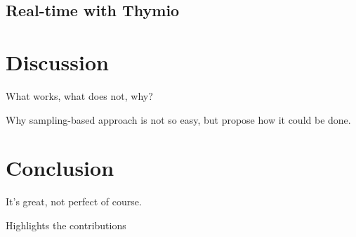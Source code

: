 \documentclass[letterpaper, 10pt, conference]{ieeeconf}
\begin{document}
\subsection{Real-time with Thymio}

\section{Discussion}

What works, what does not, why?

Why sampling-based approach is not so easy, but propose how it could be done.

\section{Conclusion}

It's great, not perfect of course.

Highlights the contributions



\end{document}
